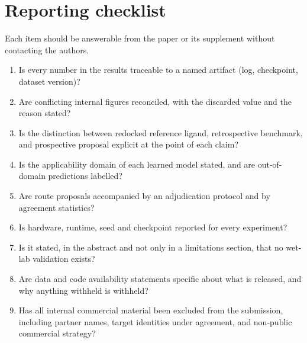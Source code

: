 \documentclass[10pt,twocolumn]{article}
\begin{document}
\appendix
\section{Reporting checklist}
\label{app:checklist}

Each item should be answerable from the paper or its supplement without
contacting the authors.

\begin{enumerate}
\item Is every number in the results traceable to a named artifact (log,
      checkpoint, dataset version)?
\item Are conflicting internal figures reconciled, with the discarded value and
      the reason stated?
\item Is the distinction between redocked reference ligand, retrospective
      benchmark, and prospective proposal explicit at the point of each claim?
\item Is the applicability domain of each learned model stated, and are
      out-of-domain predictions labelled?
\item Are route proposals accompanied by an adjudication protocol and by
      agreement statistics?
\item Is hardware, runtime, seed and checkpoint reported for every experiment?
\item Is it stated, in the abstract and not only in a limitations section, that
      no wet-lab validation exists?
\item Are data and code availability statements specific about what is
      released, and why anything withheld is withheld?
\item Has all internal commercial material been excluded from the submission,
      including partner names, target identities under agreement, and
      non-public commercial strategy?
\end{enumerate}



\end{document}
